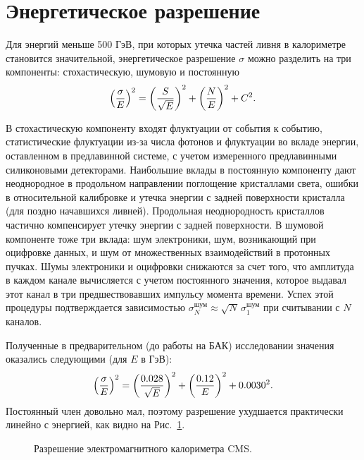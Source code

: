 \documentclass[a4paper, 10pt, twocolumn]{article}
\begin{document}
\section{Энергетическое разрешение}
Для энергий меньше 500 ГэВ, при которых утечка частей ливня в калориметре становится значительной, энергетическое разрешение $\sigma$ можно разделить на три компоненты: стохастическую, шумовую и постоянную
$$ \left( \sigma \over E \right)^2 = \left( S \over \sqrt{E} \right)^2 + \left( N \over E \right)^2 + C^2. $$

В стохастическую компоненту входят флуктуации от события к событию, статистические флуктуации из-за числа фотонов и флуктуации во вкладе энергии, оставленном в предлавинной системе, с учетом измеренного предлавинными силиконовыми детекторами. 
Наибольшие вклады в постоянную компоненту дают неоднородное в продольном направлении поглощение кристаллами света, ошибки в относительной калибровке и утечка энергии с задней поверхности кристалла (для поздно начавшихся ливней). 
Продольная неоднородность кристаллов частично компенсирует утечку энергии с задней поверхности. 
В шумовой компоненте тоже три вклада: шум электроники, шум, возникающий при оцифровке данных, и шум от множественных взаимодействий в протонных пучках. 
Шумы электроники и оцифровки снижаются за счет того, что амплитуда в каждом канале вычисляется с учетом постоянного значения, которое выдавал этот канал в три предшествовавших импульсу момента времени. 
Успех этой процедуры подтверждается зависимостью $\sigma_N^\text{шум} \approx \sqrt{N}\,\sigma_1^\text{шум}$ при считывании с $N$ каналов. 

Полученные в предварительном (до работы на БАК) исследовании значения оказались следующими (для $E$ в ГэВ): 
$$ \left( \sigma \over E \right)^2 = \left( 0.028 \over \sqrt{E} \right)^2 + \left( 0.12 \over E \right)^2 + 0.0030^2. $$
Постоянный член довольно мал, поэтому разрешение ухудшается практически линейно с энергией, как видно на Рис.~\ref{fig:graph}.









\nocite{CMS_JINST}



\newpage
\null
\begin{figure}
\caption{Разрешение электромагнитного калориметра CMS.}
\label{fig:graph}
\end{figure}
\end{document}
